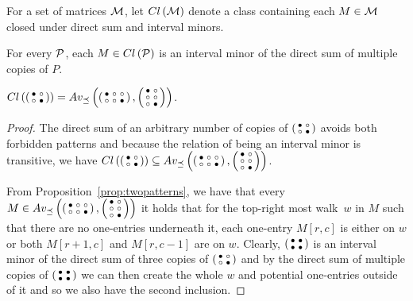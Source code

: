 \begin{defn}
For a set of matrices $\mathcal{M}$, let $Cl\left(\mathcal{M}\right)$ denote a class containing each $M\in\mathcal{M}$ closed under direct sum and interval minors.
\end{defn}

\begin{obs}
For every $\mathcal{P}$, each $M\in Cl\left(\mathcal{P}\right)$ is an interval minor of the direct sum of multiple copies of $P$.
\end{obs}

\begin{prop}
$Cl\left(\left(\begin{smallmatrix}\bullet&\circ\\\circ&\bullet\end{smallmatrix}\right)\right)=Av_{\preceq}\left(\left(\begin{smallmatrix}\bullet&\circ&\circ\\\circ&\circ&\bullet\end{smallmatrix}\right),\left(\begin{smallmatrix}\bullet&\circ\\\circ&\circ\\\circ&\bullet\end{smallmatrix}\right)\right)$.
\end{prop}
\begin{proof}
The direct sum of an arbitrary number of copies of $\left(\begin{smallmatrix}\bullet&\circ\\\circ&\bullet\end{smallmatrix}\right)$ avoids both forbidden patterns and because the relation of being an interval minor is transitive, we have $Cl\left(\left(\begin{smallmatrix}\bullet&\circ\\\circ&\bullet\end{smallmatrix}\right)\right)\subseteq Av_{\preceq}\left(\left(\begin{smallmatrix}\bullet&\circ&\circ\\\circ&\circ&\bullet\end{smallmatrix}\right),\left(\begin{smallmatrix}\bullet&\circ\\\circ&\circ\\\circ&\bullet\end{smallmatrix}\right)\right)$.

From Proposition~\ref{prop:twopatterns}, we have that every $M\in Av_{\preceq}\left(\left(\begin{smallmatrix}\bullet&\circ&\circ\\\circ&\circ&\bullet\end{smallmatrix}\right),\left(\begin{smallmatrix}\bullet&\circ\\\circ&\circ\\\circ&\bullet\end{smallmatrix}\right)\right)$ it holds that for the top-right most walk~$w$ in $M$ such that there are no one-entries underneath it, each one-entry $M[r,c]$ is either on $w$ or both $M[r+1,c]$ and $M[r,c-1]$ are on $w$. Clearly, $\left(\begin{smallmatrix}\bullet&\bullet\\\bullet&\bullet\end{smallmatrix}\right)$ is an interval minor of the direct sum of three copies of $\left(\begin{smallmatrix}\bullet&\circ\\\circ&\bullet\end{smallmatrix}\right)$ and by the direct sum of multiple copies of $\left(\begin{smallmatrix}\bullet&\bullet\\\bullet&\bullet\end{smallmatrix}\right)$ we can then create the whole $w$ and potential one-entries outside of it and so we also have the second inclusion.
\end{proof}

